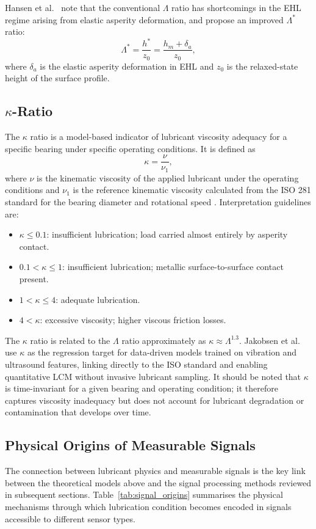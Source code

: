 Hansen et al.\ \cite{hansen_new_2021} note that the conventional $\Lambda$ ratio has shortcomings in the EHL regime arising from elastic asperity deformation, and propose an improved $\Lambda^*$ ratio:
\begin{equation}
\Lambda^* = \frac{h^*}{z_0} = \frac{h_m+\delta_a}{z_0},
\end{equation}
where $\delta_a$ is the elastic asperity deformation in EHL and $z_0$ is the relaxed-state height of the surface profile.

\subsection{$\kappa$-Ratio}
\label{subsec:kappa}
The $\kappa$ ratio is a model-based indicator of lubricant viscosity adequacy for a specific bearing under specific operating conditions. It is defined as
\begin{equation}
\kappa = \frac{\nu}{\nu_{1}},
\end{equation}
where $\nu$ is the kinematic viscosity of the applied lubricant under the operating conditions and $\nu_{1}$ is the reference kinematic viscosity calculated from the ISO 281 standard for the bearing diameter and rotational speed \cite{jakobsen_detecting_2023}. Interpretation guidelines are:
\begin{itemize}
    \item $\kappa \leq 0.1$: insufficient lubrication; load carried almost entirely by asperity contact.
    \item $0.1 < \kappa \leq 1$: insufficient lubrication; metallic surface-to-surface contact present.
    \item $1 < \kappa \leq 4$: adequate lubrication.
    \item $4 < \kappa$: excessive viscosity; higher viscous friction losses.
\end{itemize}
The $\kappa$ ratio is related to the $\Lambda$ ratio approximately as $\kappa \approx \Lambda^{1.3}$. Jakobsen et al.\ \cite{jakobsen_detecting_2023} use $\kappa$ as the regression target for data-driven models trained on vibration and ultrasound features, linking directly to the ISO standard and enabling quantitative LCM without invasive lubricant sampling. It should be noted that $\kappa$ is time-invariant for a given bearing and operating condition; it therefore captures viscosity inadequacy but does not account for lubricant degradation or contamination that develops over time.

\subsection{Physical Origins of Measurable Signals}
\label{subsec:signal_origins}
The connection between lubricant physics and measurable signals is the key link between the theoretical models above and the signal processing methods reviewed in subsequent sections. Table~\ref{tab:signal_origins} summarises the physical mechanisms through which lubrication condition becomes encoded in signals accessible to different sensor types.

